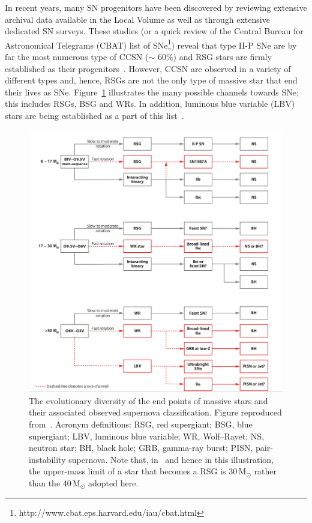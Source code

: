 In recent years, many SN progenitors have been discovered by reviewing extensive archival data available in the Local Volume as well as through extensive dedicated SN surveys.
These studies (or a quick review of the Central Bureau for Astronomical Telegrams (CBAT) list of SNe\footnote{http://www.cbat.eps.harvard.edu/iau/cbat.html}) reveal that type II-P SNe are by far the most numerous type of CCSN ($\sim$ 60\%) and RSG stars are firmly established as their progenitors~\citep[][and references therein]{Smartt09}.
However, CCSN are observed in a variety of different types and, hence, RSGs are not the only type of massive star that end their lives as SNe.
Figure~\ref{fig:SNe-Smartt} illustrates the many possible channels towards SNe; this includes RSGs, BSG and WRs.
In addition, luminous blue variable (LBV) stars are being established as a part of this list~\citep[e.g.][]{Smartt09, Groh13}.

 \begin{figure}
 \centering
 \includegraphics[width=\textwidth]{intro/Smartt09fig12}
 \caption[Endpoints of massive stars]{The evolutionary diversity of the end points of massive stars and their associated observed supernova classification. Figure reproduced from~\cite{Smartt09}. Acronym definitions: RSG, red supergiant; BSG, blue supergiant; LBV, luminous blue variable; WR, Wolf--Rayet; NS, neutron star; BH, black hole; GRB, gamma-ray burst; PISN, pair-instability supernova.
 Note that, in~\citet{Smartt09} and hence in this illustration, the upper-mass limit of a star that becomes a RSG is 30\,M$_{\odot}$ rather than the 40\,M$_{\odot}$ adopted here.
 \label{fig:SNe-Smartt}}
\end{figure}

